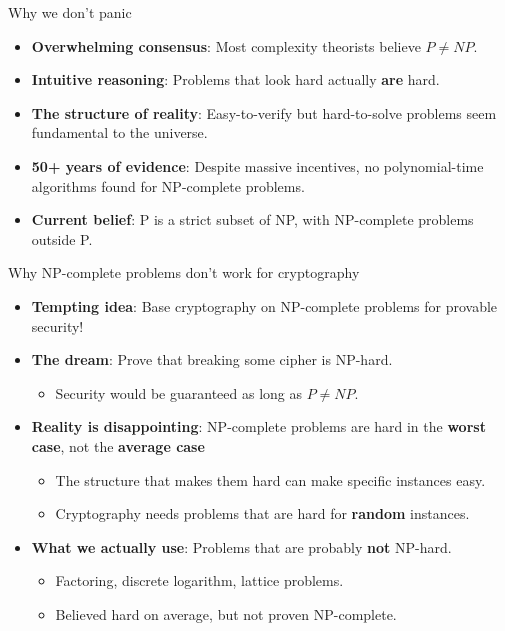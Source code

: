 \documentclass[aspectratio=169, lualatex, handout]{beamer}
\begin{document}
\begin{frame}{Why we don't panic}
	\begin{itemize}[<+->]
		\item \textbf{Overwhelming consensus}: Most complexity theorists believe $P \neq NP$.
		\item \textbf{Intuitive reasoning}: Problems that look hard actually \textbf{are} hard.
		\item \textbf{The structure of reality}: Easy-to-verify but hard-to-solve problems seem fundamental to the universe.
		\item \textbf{50+ years of evidence}: Despite massive incentives, no polynomial-time algorithms found for NP-complete problems.
		\item \textbf{Current belief}: P is a strict subset of NP, with NP-complete problems outside P.
	\end{itemize}
\end{frame}

\begin{frame}{Why NP-complete problems don't work for cryptography}
	\begin{itemize}[<+->]
		\item \textbf{Tempting idea}: Base cryptography on NP-complete problems for provable security!
		\item \textbf{The dream}: Prove that breaking some cipher is NP-hard.
		      \begin{itemize}
			      \item Security would be guaranteed as long as $P \neq NP$.
		      \end{itemize}
		\item \textbf{Reality is disappointing}: NP-complete problems are hard in the \textbf{worst case}, not the \textbf{average case}
		      \begin{itemize}
			      \item The structure that makes them hard can make specific instances easy.
			      \item Cryptography needs problems that are hard for \textbf{random} instances.
		      \end{itemize}
		\item \textbf{What we actually use}: Problems that are probably \textbf{not} NP-hard.
		      \begin{itemize}
			      \item Factoring, discrete logarithm, lattice problems.
			      \item Believed hard on average, but not proven NP-complete.
		      \end{itemize}
	\end{itemize}
\end{frame}
\end{document}
